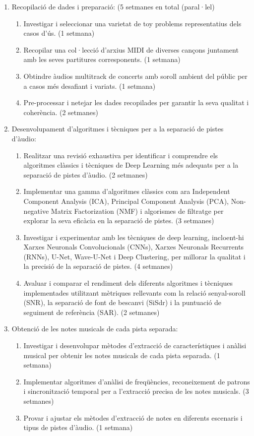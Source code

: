 \documentclass[10pt,a4paper,twocolumn,twoside]{article}
\begin{document}
\begin{enumerate}
    \item Recopilació de dades i preparació: (5 setmanes en total (paral·lel)
    \begin{enumerate}
        \item Investigar i seleccionar una varietat de toy problems representatius dels casos d'ús. (1 setmana)
        \item Recopilar una col·lecció d'arxius MIDI de diverses cançons juntament amb les seves partitures corresponents. (1 setmana)
        \item Obtindre àudios multitrack de concerts amb soroll ambient del públic per a casos més desafiant i variats. (1 setmana)
        \item Pre-processar i netejar les dades recopilades per garantir la seva qualitat i coherència. (2 setmanes)
    \end{enumerate}
    
    \item Desenvolupament d'algoritmes i tècniques per a la separació de pistes d'àudio:
    \begin{enumerate}
        \item Realitzar una revisió exhaustiva per identificar i comprendre els algoritmes clàssics i tècniques de Deep Learning més adequats per a la separació de pistes d'àudio. (2 setmanes)
        \item Implementar una gamma d'algoritmes clàssics com ara Independent Component Analysis (ICA), Principal Component Analysis (PCA), Non-negative Matrix Factorization (NMF) i algorismes de filtratge per explorar la seva eficàcia en la separació de pistes. (3 setmanes)
        \item Investigar i experimentar amb les tècniques de deep learning, incloent-hi Xarxes Neuronals Convolucionals (CNNs), Xarxes Neuronals Recurrents (RNNs), U-Net, Wave-U-Net i Deep Clustering, per millorar la qualitat i la precisió de la separació de pistes. (4 setmanes)
        \item Avaluar i comparar el rendiment dels diferents algoritmes i tècniques implementades utilitzant mètriques rellevants com la relació senyal-soroll (SNR), la separació de font de bescanvi (SiSdr) i la puntuació de seguiment de referència (SAR). (2 setmanes)
    \end{enumerate}
    
    \item Obtenció de les notes musicals de cada pista separada:
    \begin{enumerate}
        \item Investigar i desenvolupar mètodes d'extracció de característiques i anàlisi musical per obtenir les notes musicals de cada pista separada. (1 setmana)
        \item Implementar algoritmes d'anàlisi de freqüències, reconeixement de patrons i sincronització temporal per a l'extracció precisa de les notes musicals. (3 setmanes)
        \item Provar i ajustar els mètodes d'extracció de notes en diferents escenaris i tipus de pistes d'àudio. (1 setmana)
    \end{enumerate}
    

\end{enumerate}
\end{document}
